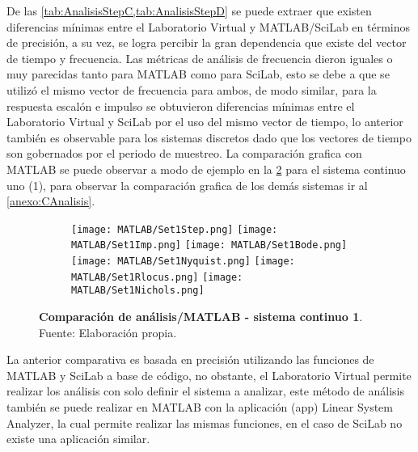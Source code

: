         De las \cref{tab:AnalisisStepC,tab:AnalisisStepD} se puede extraer que existen diferencias mínimas  entre el Laboratorio Virtual y MATLAB/SciLab en términos de precisión, a su vez, se logra percibir la gran dependencia que existe del vector de tiempo y frecuencia. Las métricas de análisis de frecuencia dieron iguales o muy parecidas tanto para MATLAB como para SciLab, esto se debe a que se utilizó el mismo vector de frecuencia para ambos, de modo similar, para la respuesta escalón e impulso se obtuvieron diferencias mínimas entre el Laboratorio Virtual y SciLab por el uso del mismo vector de tiempo, lo anterior también es observable para los sistemas discretos dado que los vectores de tiempo son gobernados por el periodo de muestreo. La comparación grafica con MATLAB se puede observar a modo de ejemplo en la \cref{fig:Set1} para el sistema continuo uno (1), para observar la comparación grafica de los demás sistemas ir al \ref{anexo:CAnalisis}.
        
        \pagebreak

        \begin{figure}[htb]
            \centering
            \begin{subfigure}[t]{0.99\textwidth}
                \centering
                \texttt{[image: MATLAB/Set1Step.png]}
                \texttt{[image: MATLAB/Set1Imp.png]}
                \texttt{[image: MATLAB/Set1Bode.png]}
                \texttt{[image: MATLAB/Set1Nyquist.png]}
                \texttt{[image: MATLAB/Set1Rlocus.png]}
                \texttt{[image: MATLAB/Set1Nichols.png]}
                \label{fig:Set1sub}
            \end{subfigure}
            \caption[Comparación de análisis/MATLAB - sistema continuo 1]{\textbf{Comparación de análisis/MATLAB - sistema continuo 1}. Fuente: Elaboración propia. \label{fig:Set1}}
        \end{figure}

        \clearpage

        La anterior comparativa es basada en precisión utilizando las funciones de MATLAB y SciLab a base de código, no obstante, el Laboratorio Virtual permite realizar los análisis con solo definir el sistema a analizar, este método de análisis también se puede realizar en MATLAB con la aplicación (app) Linear System Analyzer, la cual permite realizar las mismas funciones, en el caso de SciLab no existe una aplicación similar.

